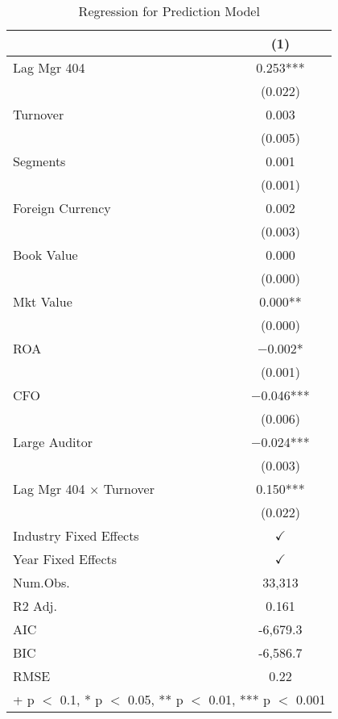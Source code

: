 \documentclass[12pt,english]{article}
\begin{document}
\begin{table}[ht]
\caption{Regression for Prediction Model}
\label{tab:prediction} 
\centering
\begin{tabular}[t]{lc}
\toprule
  & (1)\\
\midrule
Lag Mgr 404 & \num{0.253}***\\
 & \vphantom{1} (\num{0.022})\\
Turnover & \num{0.003}\\
 & (\num{0.005})\\
Segments & \num{0.001}\\
 & \vphantom{1} (\num{0.001})\\
Foreign Currency & \num{0.002}\\
 & \vphantom{1} (\num{0.003})\\
Book Value & \num{0.000}\\
 & \vphantom{1} (\num{0.000})\\
Mkt Value & \num{0.000}**\\
 & (\num{0.000})\\
ROA & \num{-0.002}*\\
 & (\num{0.001})\\
CFO & \num{-0.046}***\\
 & (\num{0.006})\\
Large Auditor & \num{-0.024}***\\
 & (\num{0.003})\\
Lag Mgr 404 × Turnover & \num{0.150}***\\
 & (\num{0.022})\\
Industry Fixed Effects  & $\checkmark$\\
Year Fixed Effects      & $\checkmark$\\
\midrule
Num.Obs. & 33,313\\
R2 Adj. & \num{0.161}\\
AIC & -6,679.3\\
BIC & -6,586.7\\
RMSE & \num{0.22}\\
\bottomrule
\multicolumn{2}{l}{\rule{0pt}{1em}+ p $<$ 0.1, * p $<$ 0.05, ** p $<$ 0.01, *** p $<$ 0.001}\\
\end{tabular}
\end{table}
\end{document}
